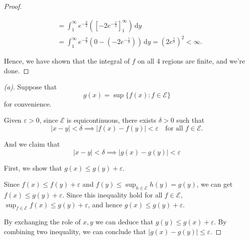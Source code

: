 \begin{proof}
\begin{itemize}
\begin{align*}
            &= \int _1^{\infty} e^{-\frac{y}{2}} \left( \left[ -2 e^{-\frac{x}{2}} \right]_1^{\infty}  \right) \, \mathrm{d} y \\
            &= \int _1^{\infty} e^{-\frac{y}{2}} \left( 0 - \left( -2e^{-\frac{1}{2}} \right)  \right) \, \mathrm{d} y = \left( 2 e^{\frac{1}{2}} \right)^2 < \infty.       
        \end{align*}
    \end{itemize}
    Hence, we have shown that the integral of \(f\) on all 4 regions are finite, and we're done. 
\end{proof}


\begin{proof}[(a)]
    Suppose that 
    \[
        g(x) = \sup\{f(x):f\in\mathcal E\}
    \]
    for convenience.

    Given $\varepsilon > 0$, since $\mathcal E$ is equicontinuous, there exists $\delta > 0$ such that 
    \[
        \vert x - y\vert < \delta \implies \vert f(x) - f(y) \vert < \varepsilon \quad \text{for all } f \in \mathcal E. 
    \]

    And we claim that 
    \[
        \vert x - y \vert < \delta\implies \vert g(x) - g(y)\vert < \varepsilon 
    \]

    First, we show that $g(x) \le g(y) + \varepsilon$. 

    Since $f(x) \le f(y) + \varepsilon$ and $f(y) \le \sup_{h \in \mathcal E} h(y) = g(y)$, we can get $f(x) \le g(y) + \varepsilon$. Since this inequality hold for all $f \in \mathcal E$, $\sup_{f\in \mathcal E} f(x) \le g(y) + \varepsilon$, and hence $g(x) \le g(y) + \varepsilon$.

    By exchanging the role of $x, y$ we can deduce that $g(y) \le g(x) + \varepsilon$. By combining two inequality, we can conclude that $\vert g(x) - g(y) \vert \le \varepsilon$.
\end{proof}

